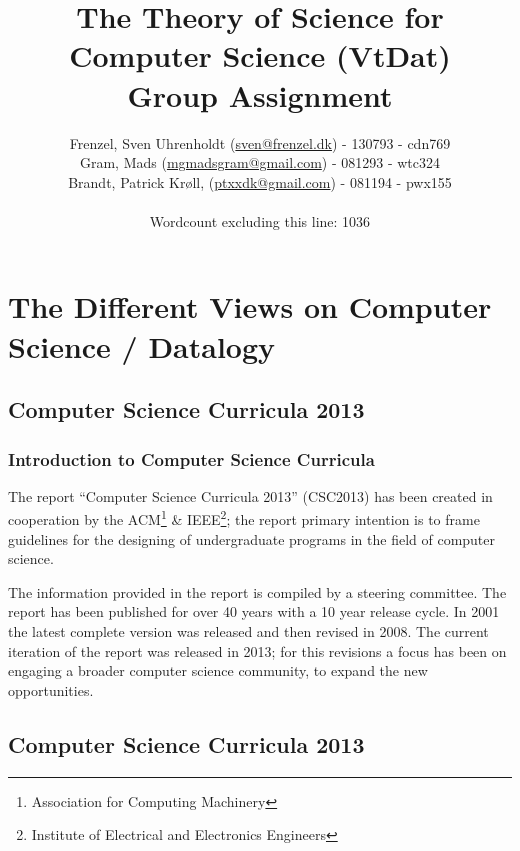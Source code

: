 \documentclass[11pt,a4paper]{article}
\author{
  \Large{
    Frenzel, Sven Uhrenholdt (\href{mailto:sven@frenzel.dk}{sven@frenzel.dk}) - 130793 - cdn769}\\
  \Large{
    Gram, Mads (\href{mailto:mgmadsgram@gmail.com}{mgmadsgram@gmail.com})  - 081293 - wtc324} \\
  \Large{
    Brandt, Patrick Krøll, (\href{mailto:ptxxdk@gmail.com}{ptxxdk@gmail.com}) - 081194 - pwx155
  }\\
   \\
   \Large{Wordcount excluding this line: 1036}
}
\title{
  \huge{The Theory of Science for\\ Computer Science (VtDat)\\}
\vspace{3cm}
\Large{\nth{1} Group Assignment}
}
\theoremstyle{plain}
\theoremstyle{definition}
\theoremstyle{remark}
\numberwithin{equation}{section}
\begin{document}


\clearpage\maketitle
\thispagestyle{empty}

\clearpage\newpage
\thispagestyle{plain}


\section{The Different Views on Computer Science / Datalogy}


\subsection{Computer Science Curricula 2013}


\subsubsection{Introduction to Computer Science Curricula}


The report ``Computer Science Curricula 2013'' (CSC2013) \cite{CSC2013} has been created in cooperation by the ACM\footnote{Association for Computing Machinery} \& IEEE\footnote{Institute of Electrical and Electronics Engineers}; the report primary intention is to frame guidelines for the designing of undergraduate programs in the field of computer science.

The information provided in the report is compiled by a steering committee. The report has been published for over 40 years with a 10 year release cycle. In 2001 the latest complete version was released and then revised in 2008. The current iteration of the report \cite{CSC2013} was released in 2013; for this revisions a focus has been on engaging a broader computer science community, to expand the new opportunities.

\subsection{Computer Science Curricula 2013}
\end{document}
